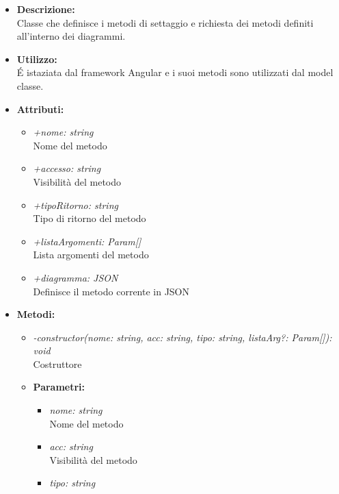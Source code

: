 				\begin{itemize}
          			\item \textbf{Descrizione:}\\
          			Classe che definisce i metodi di settaggio e richiesta dei metodi definiti all’interno dei diagrammi.
          			\item \textbf{Utilizzo:}\\
          			É istaziata dal framework Angular e i suoi metodi sono utilizzati dal model classe.
          			\item \textbf{Attributi:}\\
          			\begin{itemize}
          				\item \emph{+nome: string}\\
            			Nome del metodo
            			\item \emph{+accesso: string}\\
            			Visibilità del metodo
            			\item \emph{+tipoRitorno: string}\\
            			Tipo di ritorno del metodo
            			\item \emph{+listaArgomenti: Param[]}\\
            			Lista argomenti del metodo
            			\item \emph{+diagramma: JSON}\\
            			Definisce il metodo corrente in JSON
          			\end{itemize}
          			\item \textbf{Metodi:}\\
          			\begin{itemize}
          				\item \emph{-constructor(nome: string, acc: string, tipo: string, listaArg?: Param[]): void}\\
          				Costruttore
          				\item \textbf{Parametri:}\\
            				\begin{itemize}
            					\item \emph{nome: string}\\
            					Nome del metodo
            					\item \emph{acc: string}\\
            					Visibilità del metodo
            					\item \emph{tipo: string}\\

\end{itemize}
\end{itemize}
\end{itemize}
